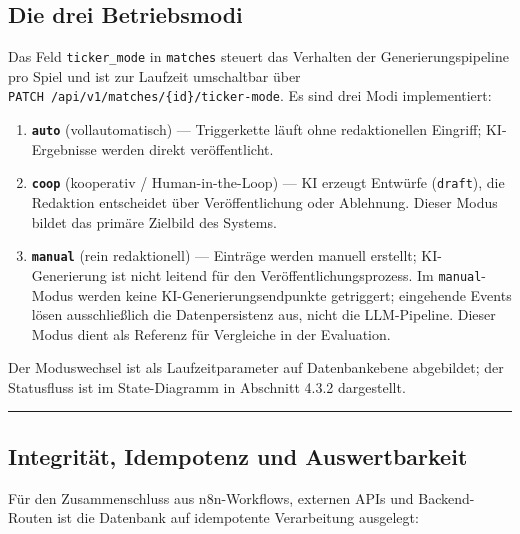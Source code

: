 \subsection{Die drei Betriebsmodi}\label{die-drei-betriebsmodi}

Das Feld \texttt{ticker\_mode} in \texttt{matches} steuert das Verhalten
der Generierungspipeline pro Spiel und ist zur Laufzeit umschaltbar über
\texttt{PATCH\ /api/v1/matches/\{id\}/ticker-mode}. Es sind drei Modi
implementiert:

\begin{enumerate}
\def\labelenumi{\arabic{enumi}.}
\tightlist
\item
  \textbf{\texttt{auto}} (vollautomatisch) --- Triggerkette läuft ohne
  redaktionellen Eingriff; KI-Ergebnisse werden direkt veröffentlicht.
\item
  \textbf{\texttt{coop}} (kooperativ / Human-in-the-Loop) --- KI erzeugt
  Entwürfe (\texttt{draft}), die Redaktion entscheidet über
  Veröffentlichung oder Ablehnung. Dieser Modus bildet das primäre
  Zielbild des Systems.
\item
  \textbf{\texttt{manual}} (rein redaktionell) --- Einträge werden
  manuell erstellt; KI-Generierung ist nicht leitend für den
  Veröffentlichungsprozess. Im \texttt{manual}-Modus werden keine
  KI-Generierungsendpunkte getriggert; eingehende Events lösen
  ausschließlich die Datenpersistenz aus, nicht die LLM-Pipeline. Dieser
  Modus dient als Referenz für Vergleiche in der Evaluation.
\end{enumerate}

Der Moduswechsel ist als Laufzeitparameter auf Datenbankebene
abgebildet; der Statusfluss ist im State-Diagramm in Abschnitt 4.3.2
dargestellt.

\begin{center}\rule{0.5\linewidth}{0.5pt}\end{center}

\subsection{Integrität, Idempotenz und
Auswertbarkeit}\label{integrituxe4t-idempotenz-und-auswertbarkeit}

Für den Zusammenschluss aus n8n-Workflows, externen APIs und
Backend-Routen ist die Datenbank auf idempotente Verarbeitung ausgelegt:


